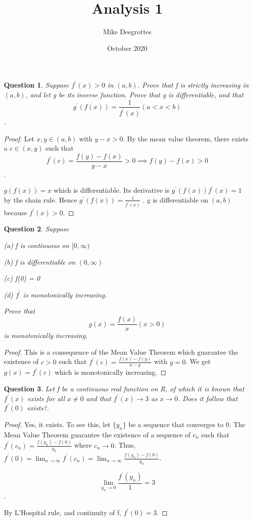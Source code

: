 \documentclass{article}
\title{Analysis 1}
\author{Mike Desgrottes}
\date{October 2020}
\theoremstyle{plain}
\newtheorem{question}{Question}
\theoremstyle{definition}
\begin{document}
\maketitle

\begin{question}
	Suppose $f^{'}(x) > 0$ in $(a,b)$. Prove that f is strictly increasing in $(a,b)$, and let g be its inverse function. Prove that g is differentiable, and that $$g^{'}(f(x)) = \frac{1}{f^{'}(x)}   (a < x < b) $$.

\end{question}

\begin{proof}
	Let $x,y \in (a,b)$ with $y - x > 0$. By the mean value theorem, there exists a $c \in (x,y)$ such that $$f^{'}(c) = \frac{f(y) - f(x)}{y - x} > 0 \implies f(y) - f(x) > 0$$. 

	$g(f(x)) = x$ which is differentiable. Its derivative is $g^{'}(f(x))f^{'}(x) = 1$ by the chain rule. Hence $g^{'}(f(x)) = \frac{1}{f^{'}(x)}$ . g is differentiable on $(a,b)$ because $f^{'}(x) > 0$.
\end{proof}

\begin{question}
	Suppose 

	(a) f is continuous on $[0,\infty)$

	(b) f is differentiable on $(0, \infty)$

	(c) f(0) = 0

	(d) $f^{'}$ is monotonically increasing.

	Prove that $$ g(x) = \frac{f(x)}{x}  (x > 0)$$ is monotonically increasing.
\end{question}

\begin{proof}
	This is a consequence of the Mean Value Theorem which guarantee the existence of $c >0$ such that $f^{'}(c) = \frac{f(x) - f(y)}{x - y}$ with $y = 0$. We get $g(x) = f^{'}(c)$ which is monotonically increasing.
\end{proof}

\begin{question}
	Let f be a continuous real function on R, of which it is known that $f^{'}(x)$ exists for all $x \not = 0$ and that $f^{'}(x) \to 3$ as $x \to 0$. Does it follow that $f^{'}(0)$ exists?.
\end{question}

\begin{proof}
	Yes, it exists. To see this, let $\{ y_{n} \}$ be a sequence that converges to 0. The Mean Value Theorem guarantee the existence of a sequence of $c_{n}$ such that $f^{'}(c_{n}) = \frac{f(y_{n}) - f(0)}{y_{n}}$ where $c_{n} \to 0$. Thus, $f^{'}(0) = \lim_{n \to \infty} f^{'}(c_{n}) = \lim_{n \to \infty} \frac{f(y_{n}) - f(0)}{y_{n}}$.

	$$\lim_{y_{n} \to 0} \frac{f^{'}(y_{n})}{1} = 3 $$.

	By L'Hospital rule, and continuity of f, $f^{'}(0) = 3$.
\end{proof}
\end{document}
